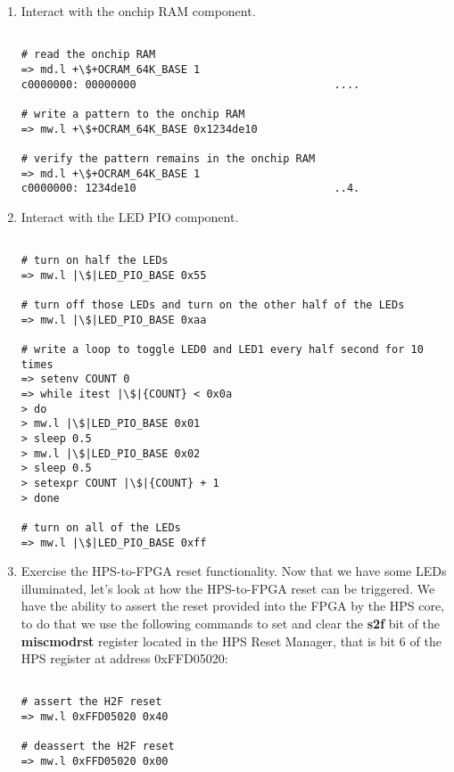 \begin{flushleft}
\begin{enumerate}[
	label=\textbf{Step \arabic*.},
	leftmargin=*,
	widest={00},
	align=left]
\begin{enumerate}[
	label=\textbf{Step \arabic{enumi}\alph*.},
	leftmargin=*,
	align=left]
\item Interact with the onchip RAM component.

\begin{verbatim}

# read the onchip RAM
=> md.l +\$+OCRAM_64K_BASE 1
c0000000: 00000000                               ....

# write a pattern to the onchip RAM
=> mw.l +\$+OCRAM_64K_BASE 0x1234de10

# verify the pattern remains in the onchip RAM
=> md.l +\$+OCRAM_64K_BASE 1
c0000000: 1234de10                               ..4.

\end{verbatim}

\item Interact with the LED PIO component.

\begin{verbatim}

# turn on half the LEDs
=> mw.l |\$|LED_PIO_BASE 0x55

# turn off those LEDs and turn on the other half of the LEDs
=> mw.l |\$|LED_PIO_BASE 0xaa

# write a loop to toggle LED0 and LED1 every half second for 10 times
=> setenv COUNT 0
=> while itest |\$|{COUNT} < 0x0a
> do
> mw.l |\$|LED_PIO_BASE 0x01
> sleep 0.5
> mw.l |\$|LED_PIO_BASE 0x02
> sleep 0.5
> setexpr COUNT |\$|{COUNT} + 1
> done

# turn on all of the LEDs
=> mw.l |\$|LED_PIO_BASE 0xff

\end{verbatim}

\item Exercise the HPS-to-FPGA reset functionality.  Now that we have some LEDs illuminated, let's look at how the HPS-to-FPGA reset can be triggered.  We have the ability to assert the reset provided into the FPGA by the HPS core, to do that we use the following commands to set and clear the \textbf{s2f} bit of the \textbf{miscmodrst} register located in the HPS Reset Manager, that is bit 6 of the HPS register at address 0xFFD05020:

\begin{verbatim}

# assert the H2F reset
=> mw.l 0xFFD05020 0x40

# deassert the H2F reset
=> mw.l 0xFFD05020 0x00


\end{verbatim}
\end{enumerate}
\end{enumerate}
\end{flushleft}
